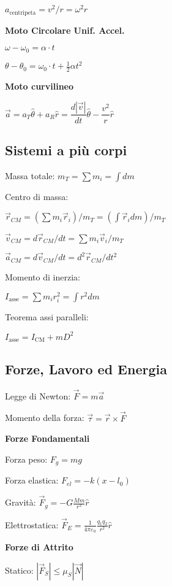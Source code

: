 \documentclass[10pt]{article}
\begin{document}
\begin{multicols}{3}
$ a_{\mathrm {centripeta}} =  {v^2} / r  = \omega^2 r  $

\textbf{Moto Circolare Unif. Accel.}

$  \omega - \omega_{0} = \alpha \cdot t $

$  \theta - \theta_0 = \omega_0\cdot t + \frac 1 2 \alpha t^2 $

\textbf{Moto curvilineo}

$\vec a = a_T\hat\theta+a_R\hat r = \dfrac {d\left| \vec v \right|} {dt} \hat\theta -  \dfrac {v^2} {r} \hat r $

\subsection*{Sistemi a pi\`u corpi}

Massa totale: $m_{T} = \sum m_i = \int dm$

Centro di massa:

$\vec r_{CM} =  ( {\sum m_i \vec r_i} ) / m_T = (\int \vec r_i dm ) / m_T$

$\vec v_{CM} = {d\vec r_{CM}} / {dt} = {\sum m_i \vec v_i} / m_{T} $

$\vec a_{CM} = {d\vec v_{CM}} / {dt} = {d^2\vec r_{CM}} / {dt^2}  $

Momento di inerzia:

$I_\mathrm{asse} = \sum m_i r_i^2 = \int r^2 dm$

Teorema assi paralleli:

$I_\mathrm{asse} = I_\mathrm{CM} + m D^2 $

\subsection*{Forze, Lavoro ed Energia}

Legge di Newton: $\vec F = m \vec a$

Momento della forza: $\vec \tau = \vec r \times \vec F$

\textbf{Forze Fondamentali}

Forza peso:   $ F_g  = m g $

Forza elastica: $  F_{el} = - k (x -l_0)$

Gravit\`a: $\displaystyle \vec F_g = -G \frac {Mm} {r^2} \hat r$

Elettrostatica: $\displaystyle \vec F_E = \frac 1 {4\pi \varepsilon_0}
\frac {q_1 q_2} {r^2} \hat r$

\textbf{Forze di Attrito}

Statico: $| \vec F_S | \leq \mu_S | \vec N |$


\end{multicols}
\end{document}
